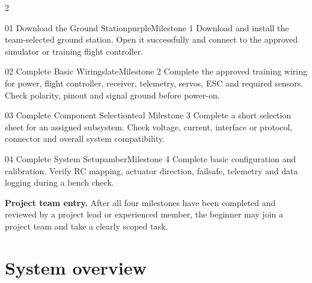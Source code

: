 \documentclass[10pt,a4paper]{article}
\begin{document}
\begin{multicols}{2}
\begin{project}{01 \; Download the Ground Station}{purple}{Milestone 1}
Download and install the team-selected ground station. Open it successfully and connect to the approved simulator or training flight controller.
\end{project}

\begin{project}{02 \; Complete Basic Wiring}{slate}{Milestone 2}
Complete the approved training wiring for power, flight controller, receiver, telemetry, servos, ESC and required sensors. Check polarity, pinout and signal ground before power-on.
\end{project}

\columnbreak

\begin{project}{03 \; Complete Component Selection}{teal}{  Milestone 3}
Complete a short selection sheet for an assigned subsystem. Check voltage, current, interface or protocol, connector and overall system compatibility.
\end{project}

\begin{project}{04 \; Complete System Setup}{amber}{Milestone 4}
Complete basic configuration and calibration. Verify RC mapping, actuator direction, failsafe, telemetry and data logging during a bench check.
\end{project}
\end{multicols}

\begin{callout}[teal]
\textbf{Project team entry.} After all four milestones have been completed and reviewed by a project lead or experienced member, the beginner may join a project team and take a clearly scoped task.
\end{callout}

\clearpage
\section{System overview}
\end{document}

